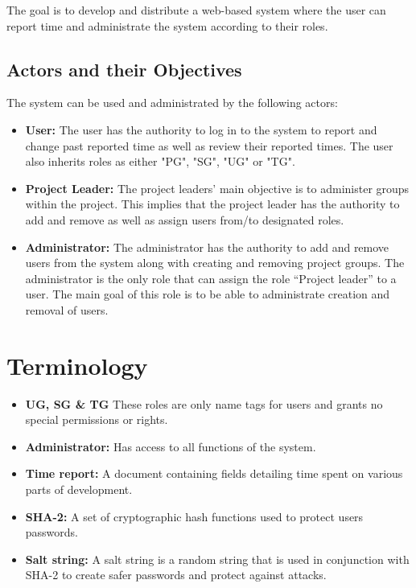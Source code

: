 \documentclass{article}
\begin{document}
The goal is to develop and distribute a web-based system where the user can report time and administrate the system according to their roles.

\subsection{Actors and their Objectives}
The system can be used and administrated by the following actors:

\begin{itemize}
  \item \textbf{User:} The user has the authority to log in to the system to report and  change past reported time as well as review their reported times. The user also inherits roles as either "PG", "SG", "UG" or "TG".
  \item \textbf{Project Leader:}
  The project leaders' main objective is to administer groups within the project. This implies that the project leader has the authority to add and remove as well as assign users from/to designated roles.
   \item \textbf{Administrator:} The administrator has the authority to add and remove users from the system along with creating and removing project groups. The administrator is the only role that can assign the role “Project leader” to a user. The main goal of this role is to be able to administrate creation and removal of users.
\end{itemize}


\section{Terminology}

\begin{itemize}
\item \textbf{UG, SG \& TG} These roles are only name tags for  users and grants no special permissions or rights.
\item \textbf{Administrator:} 
  Has access to all functions of the system.
\item \textbf{Time report:}
  A document containing fields detailing time spent on various parts of development.
\item \textbf{SHA-2:}
  A set of cryptographic hash functions used to protect users passwords.
\item \textbf{Salt string:}
  A salt string is a random string that is used in conjunction with SHA-2 to create safer passwords and protect against attacks.
\end{itemize}
\end{document}
